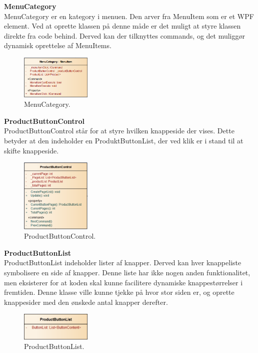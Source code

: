 \textbf{MenuCategory}\\
MenuCategory er en kategory i menuen. Den arver fra MenuItem som er et WPF element. Ved at oprette klassen på denne måde er det muligt at styre klassen direkte fra code behind. Derved kan der tilknyttes commands, og det muliggør dynamisk oprettelse af MenuItems.


\begin{figure}[H]
	\centering
	\includegraphics[width=0.3\textwidth]{Systemdesign/Frontend/pics/MenuCategory}
	\caption{MenuCategory.}
	\label{fig:PBC}
\end{figure}

\textbf{ProductButtonControl} \\
ProductButtonControl står for at styre hvilken knappeside der vises. Dette betyder at den indeholder en ProduktButtonList, der ved klik er i stand til at skifte knappeside.

\begin{figure}[H]
	\centering
	\includegraphics[width=0.3\textwidth]{Systemdesign/Frontend/pics/ProductButtonControl}
	\caption{ProductButtonControl.}
	\label{fig:PBC}
\end{figure}

\textbf{ProductButtonList} \\
ProductButtonList indeholder lister af knapper. Derved kan hver knappeliste symbolisere en side af knapper. Denne liste har ikke nogen anden funktionalitet, men eksisterer for at koden skal kunne facilitere dynamiske knappestørrelser i fremtiden. Denne klasse ville kunne tjekke på hvor stor siden er, og oprette knappesider med den ønskede antal knapper derefter.


\begin{figure}[H]
	\centering
	\includegraphics[width=0.3\textwidth]{Systemdesign/Frontend/pics/ProductButtonList}
	\caption{ProductButtonList.}
	\label{fig:PBL}
\end{figure}

